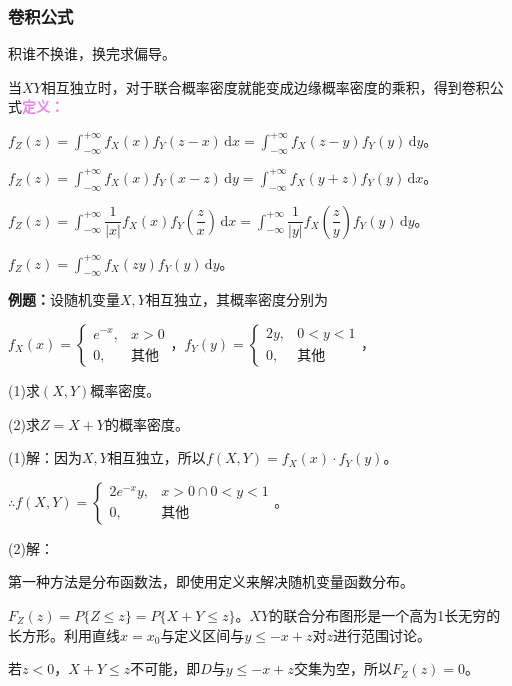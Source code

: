 \subsubsection{卷积公式}

积谁不换谁，换完求偏导。

当$XY$相互独立时，对于联合概率密度就能变成边缘概率密度的乘积，得到卷积公式\textcolor{violet}{\textbf{定义：}}

$f_Z(z)=\int_{-\infty}^{+\infty}f_X(x)f_Y(z-x)\,\textrm{d}x=\int_{-\infty}^{+\infty}f_X(z-y)f_Y(y)\,\textrm{d}y$。

$f_Z(z)=\int_{-\infty}^{+\infty}f_X(x)f_Y(x-z)\,\textrm{d}y=\int_{-\infty}^{+\infty}f_X(y+z)f_Y(y)\,\textrm{d}x$。

$f_Z(z)=\displaystyle{\int_{-\infty}^{+\infty}}\dfrac{1}{\vert x\vert}f_X(x)f_Y\left(\dfrac{z}{x}\right)\,\textrm{d}x=\displaystyle{\int_{-\infty}^{+\infty}}\dfrac{1}{\vert y\vert}f_X\left(\dfrac{z}{y}\right)f_Y(y)\,\textrm{d}y$。

$f_Z(z)=\int_{-\infty}^{+\infty}f_X(zy)f_Y(y)\,\textrm{d}y$。

\textbf{例题：}设随机变量$X,Y$相互独立，其概率密度分别为

$f_X(x)=\left\{\begin{array}{ll}
    e^{-x}, & x>0 \\
    0, & \text{其他} 
\end{array}\right.$，$f_Y(y)=\left\{\begin{array}{ll}
    2y, & 0<y<1 \\
    0, & \text{其他} 
\end{array}\right.$，

(1)求$(X,Y)$概率密度。

(2)求$Z=X+Y$的概率密度。

(1)解：因为$X,Y$相互独立，所以$f(X,Y)=f_X(x)\cdot f_Y(y)$。

$\therefore f(X,Y)=\left\{\begin{array}{ll}
    2e^{-x}y, & x>0\cap0<y<1 \\
    0, & \text{其他} 
\end{array}\right.$。

(2)解：

第一种方法是分布函数法，即使用定义来解决随机变量函数分布。

$F_Z(z)=P\{Z\leqslant z\}=P\{X+Y\leqslant z\}$。$XY$的联合分布图形是一个高为1长无穷的长方形。利用直线$x=x_0$与定义区间与$y\leqslant -x+z$对$z$进行范围讨论。

若$z<0$，$X+Y\leqslant z$不可能，即$D$与$y\leqslant-x+z$交集为空，所以$F_Z(z)=0$。


